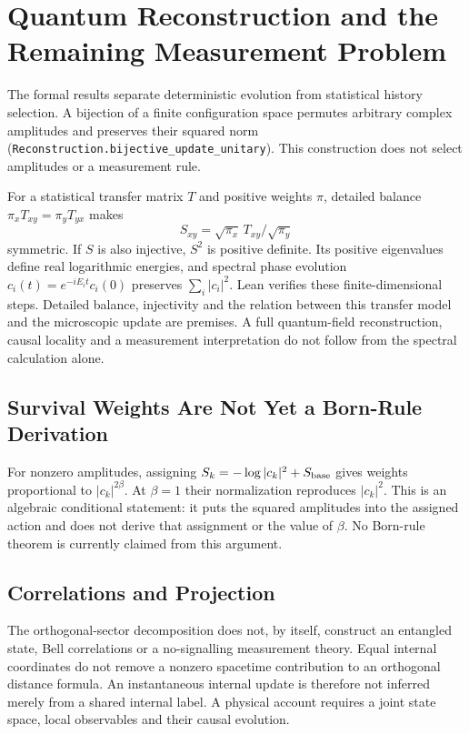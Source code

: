 \section{Quantum Reconstruction and the Remaining Measurement Problem}
\label{app:quantum_fundamentals}

The formal results separate deterministic evolution from statistical history selection. A bijection of a finite configuration space permutes arbitrary complex amplitudes and preserves their squared norm (\nolinkurl{Reconstruction.bijective_update_unitary}). This construction does not select amplitudes or a measurement rule.

For a statistical transfer matrix $T$ and positive weights $\pi$, detailed balance
$\pi_xT_{xy}=\pi_yT_{yx}$ makes
\begin{equation}
 S_{xy}=\sqrt{\pi_x}\,T_{xy}/\sqrt{\pi_y}
\end{equation}
symmetric. If $S$ is also injective, $S^2$ is positive definite. Its positive eigenvalues define real logarithmic energies, and spectral phase evolution $c_i(t)=e^{-iE_it}c_i(0)$ preserves $\sum_i|c_i|^2$. Lean verifies these finite-dimensional steps. Detailed balance, injectivity and the relation between this transfer model and the microscopic update are premises. A full quantum-field reconstruction, causal locality and a measurement interpretation do not follow from the spectral calculation alone.

\subsection{Survival Weights Are Not Yet a Born-Rule Derivation}
For nonzero amplitudes, assigning $S_k=-\log|c_k|^2+S_{\rm base}$ gives weights proportional to $|c_k|^{2\beta}$. At $\beta=1$ their normalization reproduces $|c_k|^2$. This is an algebraic conditional statement: it puts the squared amplitudes into the assigned action and does not derive that assignment or the value of $\beta$. No Born-rule theorem is currently claimed from this argument.

\subsection{Correlations and Projection}
The orthogonal-sector decomposition does not, by itself, construct an entangled state, Bell correlations or a no-signalling measurement theory. Equal internal coordinates do not remove a nonzero spacetime contribution to an orthogonal distance formula. An instantaneous internal update is therefore not inferred merely from a shared internal label. A physical account requires a joint state space, local observables and their causal evolution.

